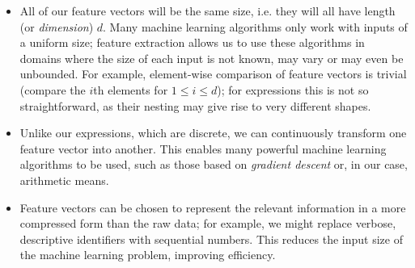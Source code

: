\begin{itemize}
\item All of our feature vectors will be the same size, i.e. they will all have
  length (or \emph{dimension}) $d$. Many machine learning algorithms only work
  with inputs of a uniform size; feature extraction allows us to use these
  algorithms in domains where the size of each input is not known, may vary or
  may even be unbounded. For example, element-wise comparison of feature vectors
  is trivial (compare the $i$th elements for $1 \leq i \leq d$); for expressions
  this is not so straightforward, as their nesting may give rise to very
  different shapes.
\item Unlike our expressions, which are discrete, we can continuously transform
  one feature vector into another. This enables many powerful machine learning
  algorithms to be used, such as those based on \emph{gradient descent} or, in
  our case, arithmetic means.
\item Feature vectors can be chosen to represent the relevant information in a
  more compressed form than the raw data; for example, we might replace verbose,
  descriptive identifiers with sequential numbers. This reduces the input size
  of the machine learning problem, improving efficiency.
\end{itemize}
